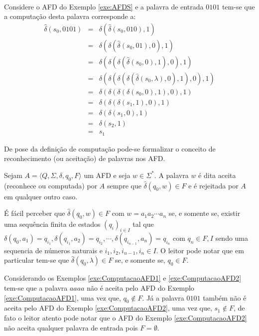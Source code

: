 \

\begin{exem}\label{exe:ComputacaoAFD2}
	Considere o AFD do Exemplo \ref{exe:AFDS} e a palavra de entrada $0101$ tem-se que a computação desta palavra corresponde a:
	\begin{eqnarray*}
		\widehat{\delta}(s_0, 0101) & = & \delta(\widehat{\delta}(s_0, 010), 1)\\
		& = & \delta(\delta(\widehat{\delta}(s_0, 01), 0), 1)\\
		& = & \delta(\delta(\delta(\widehat{\delta}(s_0, 0), 1), 0), 1)\\
		& = & \delta(\delta(\delta(\delta(\widehat{\delta}(s_0, \lambda), 0), 1), 0), 1)\\
		& = & \delta(\delta(\delta(\delta(s_0, 0), 1), 0), 1)\\
		& = & \delta(\delta(\delta(s_1, 1), 0), 1)\\
		& = & \delta(\delta(s_1, 0), 1)\\
		& = & \delta(s_2, 1)\\
		& = & s_1
	\end{eqnarray*}
\end{exem}

De pose da definição de computação pode-se formalizar o conceito de reconhecimento (ou aceitação) de palavras nos AFD.

\begin{definition}\label{defi:PalavraAceitaPorAFD}
	\cite{benjaLivro2010} Sejam $A = \langle Q, \Sigma, \delta, q_0, F\rangle$ um AFD e seja $w \in \Sigma^*$. A palavra $w$ é dita aceita (reconhece ou computada) por $A$ sempre que $\widehat{\delta}(q_0, w) \in F$ e é rejeitada por $A$ em qualquer outro caso.
\end{definition}

É fácil perceber que $\widehat{\delta}(q_0, w) \in F$ com $w = a_1a_2\cdots a_n$ se, e somente se, existir uma sequência finita de estados $(q_i)_{i \in I}$ tal que $\delta(q_0, a_1) = q_{i_1}, \delta(q_{i_1}, a_2) = q_{i_2}, \cdots, \delta(q_{i_{n-1}}, a_{n}) = q_{i_n}$ com $q_n \in F, I$ sendo uma sequencia de números naturais e $i_1, i_2, i_{n-1}, i_n \in I$. O leitor pode notar que em particular tem-se que $\widehat{\delta}(q_0, \lambda) \in F$ se, e somente se, $q_0 \in F$.

\begin{exem}\label{exe:AceiteAFD1}
	Considerando os Exemplos \ref{exe:ComputacaoAFD1} e \ref{exe:ComputacaoAFD2} tem-se que a palavra $aaaa$ não é aceita pelo AFD do Exemplo \ref{exe:ComputacaoAFD1}, uma vez que, $q_0 \notin F$. Já a palavra $0101$ também não é aceita pelo AFD do Exemplo \ref{exe:ComputacaoAFD2}, uma vez que, $s_1 \notin F$, de fato o leitor atento pode notar que o AFD do Exemplo \ref{exe:ComputacaoAFD2} não aceita qualquer palavra de entrada pois $F = \emptyset$.
\end{exem}

